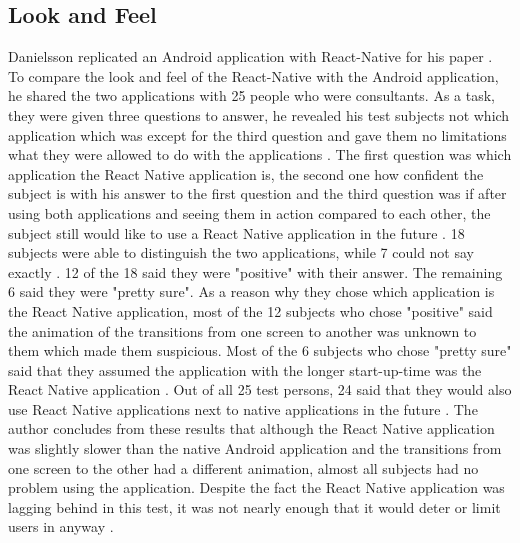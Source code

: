\documentclass[Bachelor,BIF,english]{twbook}
\begin{document}
\subsection{Look and Feel}
Danielsson replicated an Android application with React-Native for his paper \cite{Danielsson_2016}. To compare the look and feel of the React-Native with the Android application, he shared the two applications with 25 people who were consultants. As a task, they were given three questions to answer, he revealed his test subjects not which application which was except for the third question and gave them no limitations what they were allowed to do with the applications \cite[p.~29]{Danielsson_2016}. The first question was which application the React Native application is, the second one how confident the subject is with his answer to the first question and the third question was if after using both applications and seeing them in action compared to each other, the subject still would like to use a React Native application in the future \cite[p.~29-31]{Danielsson_2016}. 18 subjects were able to distinguish the two applications, while 7 could not say exactly \cite[p.~30]{Danielsson_2016}. 12 of the 18 said they were "positive" with their answer. The remaining 6 said they were "pretty sure". As a reason why they chose which application is the React Native application, most of the 12 subjects who chose "positive" said the animation of the transitions from one screen to another was unknown to them which made them suspicious. Most of the 6 subjects who chose "pretty sure" said that they assumed the application with the longer start-up-time was the React Native application \cite[p.~30]{Danielsson_2016}. Out of all 25 test persons, 24 said that they would also use React Native applications next to native applications in the future \cite[p.~31]{Danielsson_2016}. The author concludes from these results that although the React Native application was slightly slower than the native Android application and the transitions from one screen to the other had a different animation, almost all subjects had no problem using the application. Despite the fact the React Native application was lagging behind in this test, it was not nearly enough that it would deter or limit users in anyway \cite[p.~45]{Danielsson_2016}.
\\[\baselineskip]
\end{document}
